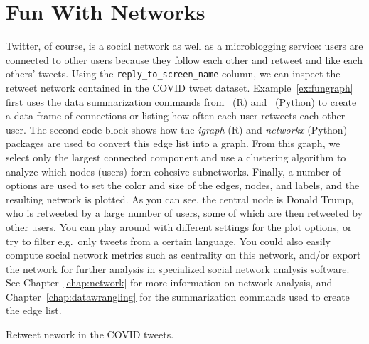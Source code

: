 

\section{Fun With Networks}\label{sec:funnet}

Twitter, of course, is a social network as well as a microblogging service:
users are connected to other users because they follow each other and retweet and like each others' tweets.
Using the \verb+reply_to_screen_name+ column, we can inspect the retweet network contained in the COVID tweet dataset.
Example~\ref{ex:fungraph} first uses the data summarization commands from \tidyverse\ (R) and \pandas\ (Python) to
create a data frame of connections or  listing how often each user retweets each other user.
The second code block shows how the \emph{igraph} (R) and \emph{networkx} (Python) packages are used to convert this edge list into a graph.
From this graph, we select only the largest connected component and use a clustering algorithm to analyze which
nodes (users) form cohesive subnetworks.
Finally, a number of options are used to set the color and size of the edges, nodes, and labels,
and the resulting network is plotted.
As you can see, the central node is Donald Trump, who is retweeted by a large number of users,
some of which are then retweeted by other users.
You can play around with different settings for the plot options,
or try to filter e.g.\ only tweets from a certain language. 
You could also easily compute social network metrics such as centrality on this network,
and/or export the network for further analysis in specialized social network analysis software.
See Chapter~\ref{chap:network} for more information on network analysis,
and Chapter~\ref{chap:datawrangling} for the summarization commands used to create the edge list.

\begin{ccsexample}
\caption{Retweet nework in the COVID tweets.}\label{ex:fungraph}
\end{ccsexample}

